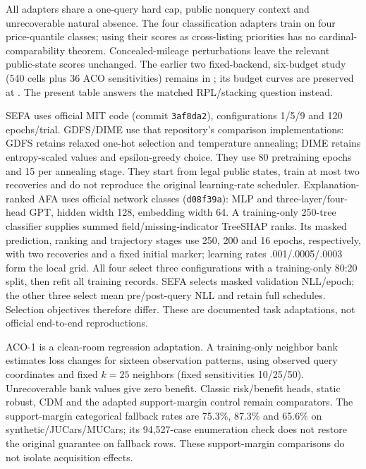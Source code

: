 \documentclass[11pt]{article}
\begin{document}
All adapters share a one-query hard cap, public nonquery context and
unrecoverable natural absence. The four classification adapters train on
four price-quantile classes; using their scores as cross-listing priorities
has no cardinal-comparability theorem. Concealed-mileage perturbations leave
the relevant public-state scores unchanged. The earlier two fixed-backend,
six-budget study (540 cells plus 36 ACO sensitivities) remains in
; its budget curves are preserved at
. The present
table answers the matched RPL/stacking question instead.

SEFA uses official MIT code (commit \texttt{3af8da2}), configurations 1/5/9
and 120 epochs/trial. GDFS/DIME use that repository's comparison
implementations: GDFS retains relaxed one-hot selection and temperature
annealing; DIME retains entropy-scaled values and epsilon-greedy choice.
They use 80 pretraining epochs and 15 per annealing stage. They start from legal public states, train at most two
recoveries and do not reproduce the original learning-rate scheduler.
Explanation-ranked AFA uses official network classes (\texttt{d08f39a}):
MLP and three-layer/four-head GPT, hidden width 128, embedding width 64.
A training-only 250-tree classifier supplies summed field/missing-indicator
TreeSHAP ranks. Its masked prediction, ranking and trajectory stages use 250, 200 and 16
epochs, respectively, with two recoveries and a fixed initial marker;
learning rates .001/.0005/.0003 form the local grid. All four select three
configurations with a training-only 80:20 split, then refit all training
records. SEFA selects masked validation NLL/epoch; the other three select
mean pre/post-query NLL and retain full schedules. Selection objectives
therefore differ. These are documented task adaptations, not official
end-to-end reproductions.

ACO-1 is a clean-room regression adaptation. A training-only neighbor bank
estimates loss changes for sixteen observation patterns, using observed query
coordinates and fixed $k=25$ neighbors (fixed sensitivities 10/25/50).
Unrecoverable bank values give zero benefit. Classic risk/benefit heads,
static robust, CDM and the adapted support-margin control remain comparators.
The support-margin categorical fallback rates are 75.3\%, 87.3\% and 65.6\%
on synthetic/JUCars/MUCars; its 94,527-case enumeration check does not restore
the original guarantee on fallback rows. These support-margin comparisons do not isolate acquisition effects.
\end{document}

